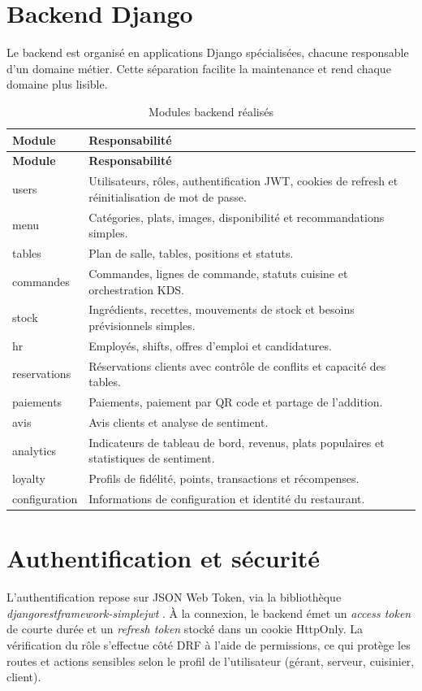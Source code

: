 \section{Backend Django}
Le backend est organisé en applications Django spécialisées, chacune responsable d'un domaine métier. Cette séparation facilite la maintenance et rend chaque domaine plus lisible.

\begin{longtable}{p{4cm}p{10cm}}
\caption{Modules backend réalisés}\\
\toprule
\textbf{Module} & \textbf{Responsabilité} \\
\midrule
\endfirsthead
\toprule
\textbf{Module} & \textbf{Responsabilité} \\
\midrule
\endhead
users & Utilisateurs, rôles, authentification JWT, cookies de refresh et réinitialisation de mot de passe. \\
menu & Catégories, plats, images, disponibilité et recommandations simples. \\
tables & Plan de salle, tables, positions et statuts. \\
commandes & Commandes, lignes de commande, statuts cuisine et orchestration KDS. \\
stock & Ingrédients, recettes, mouvements de stock et besoins prévisionnels simples. \\
hr & Employés, shifts, offres d'emploi et candidatures. \\
reservations & Réservations clients avec contrôle de conflits et capacité des tables. \\
paiements & Paiements, paiement par QR code et partage de l'addition. \\
avis & Avis clients et analyse de sentiment. \\
analytics & Indicateurs de tableau de bord, revenus, plats populaires et statistiques de sentiment. \\
loyalty & Profils de fidélité, points, transactions et récompenses. \\
configuration & Informations de configuration et identité du restaurant. \\
\bottomrule
\end{longtable}

\section{Authentification et sécurité}
L'authentification repose sur JSON Web Token, via la bibliothèque \emph{djangorestframework-simplejwt} \cite{simplejwt}. À la connexion, le backend émet un \emph{access token} de courte durée et un \emph{refresh token} stocké dans un cookie HttpOnly. La vérification du rôle s'effectue côté DRF à l'aide de permissions, ce qui protège les routes et actions sensibles selon le profil de l'utilisateur (gérant, serveur, cuisinier, client).

